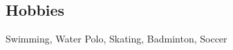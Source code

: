\documentclass[margin,line,letter]{resume}
\begin{document}
\begin{resume}
    
    
    

 


    
\section{\mysidestyle Hobbies}
    Swimming, Water Polo, Skating, Badminton, Soccer

\end{resume}
\end{document}

